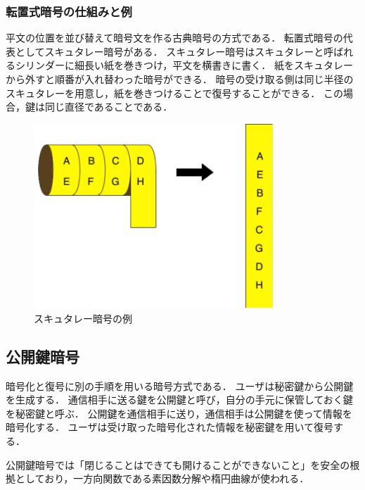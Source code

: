 \documentclass[a4j,12pt]{jsarticle}
\begin{document}
\subsubsection{転置式暗号の仕組みと例}
平文の位置を並び替えて暗号文を作る古典暗号の方式である．
転置式暗号の代表としてスキュタレー暗号がある．
スキュタレー暗号はスキュタレーと呼ばれるシリンダーに細長い紙を巻きつけ，平文を横書きに書く．
紙をスキュタレーから外すと順番が入れ替わった暗号ができる．
暗号の受け取る側は同じ半径のスキュタレーを用意し，紙を巻きつけることで復号することができる．
この場合，鍵は同じ直径であることである．\\

\begin{figure}[H]
\centering
\includegraphics[width=9cm]{062.pdf}
\caption{スキュタレー暗号の例}
\label{fig:06}
\end{figure} 


\newpage
\subsection{公開鍵暗号}

暗号化と復号に別の手順を用いる暗号方式である．
ユーザは秘密鍵から公開鍵を生成する．
通信相手に送る鍵を公開鍵と呼び，自分の手元に保管しておく鍵を秘密鍵と呼ぶ．
公開鍵を通信相手に送り，通信相手は公開鍵を使って情報を暗号化する．
ユーザは受け取った暗号化された情報を秘密鍵を用いて復号する．

公開鍵暗号では「閉じることはできても開けることができないこと」を安全の根拠としており，一方向関数である素因数分解や楕円曲線が使われる．
\end{document}
